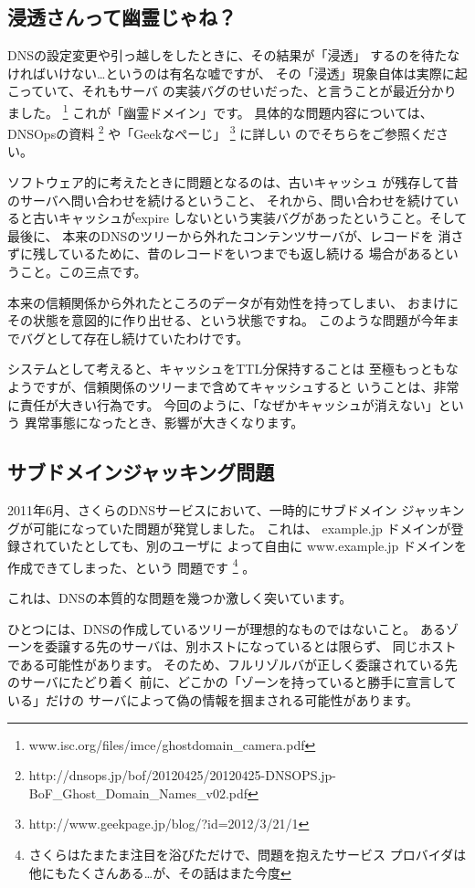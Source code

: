 \subsection{ 浸透さんって幽霊じゃね？ }

DNSの設定変更や引っ越しをしたときに、その結果が「浸透」
するのを待たなければいけない…というのは有名な嘘ですが、
その「浸透」現象自体は実際に起こっていて、それもサーバ
の実装バグのせいだった、と言うことが最近分かりました。
\footnote{www.isc.org/files/imce/ghostdomain\_camera.pdf}
これが「幽霊ドメイン」です。 
具体的な問題内容については、DNSOpsの資料 
\footnote{http://dnsops.jp/bof/20120425/20120425-DNSOPS.jp-BoF\_Ghost\_Domain\_Names\_v02.pdf}
や「Geekなぺーじ」
\footnote{http://www.geekpage.jp/blog/?id=2012/3/21/1} に詳しい
のでそちらをご参照ください。

ソフトウェア的に考えたときに問題となるのは、古いキャッシュ
が残存して昔のサーバへ問い合わせを続けるということ、
それから、問い合わせを続けていると古いキャッシュがexpire
しないという実装バグがあったということ。そして最後に、
本来のDNSのツリーから外れたコンテンツサーバが、レコードを
消さずに残しているために、昔のレコードをいつまでも返し続ける
場合があるということ。この三点です。

本来の信頼関係から外れたところのデータが有効性を持ってしまい、
おまけにその状態を意図的に作り出せる、という状態ですね。
このような問題が今年までバグとして存在し続けていたわけです。

システムとして考えると、キャッシュをTTL分保持することは
至極もっともなようですが、信頼関係のツリーまで含めてキャッシュすると
いうことは、非常に責任が大きい行為です。
今回のように、「なぜかキャッシュが消えない」という
異常事態になったとき、影響が大きくなります。


\subsection{ サブドメインジャッキング問題 }
2011年6月、さくらのDNSサービスにおいて、一時的にサブドメイン
ジャッキングが可能になっていた問題が発覚しました。
これは、 example.jp ドメインが登録されていたとしても、別のユーザに
よって自由に www.example.jp ドメインを作成できてしまった、という
問題です
\footnote{さくらはたまたま注目を浴びただけで、問題を抱えたサービス
プロバイダは他にもたくさんある…が、その話はまた今度}
。

これは、DNSの本質的な問題を幾つか激しく突いています。

ひとつには、DNSの作成しているツリーが理想的なものではないこと。
あるゾーンを委譲する先のサーバは、別ホストになっているとは限らず、
同じホストである可能性があります。
そのため、フルリゾルバが正しく委譲されている先のサーバにたどり着く
前に、どこかの「ゾーンを持っていると勝手に宣言している」だけの
サーバによって偽の情報を掴まされる可能性があります。

